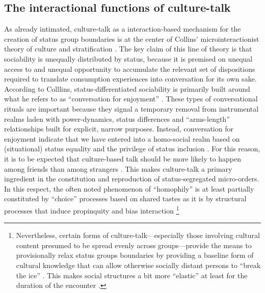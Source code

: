 \subsection{The interactional functions of culture-talk}
As already intimated, culture-talk as a interaction-based mechanism for the creation of status group boundaries is at the center of Collins' microinteractionist theory of culture and stratification \citep{collins75, collins81, collins00, collins04}. The key claim of this line of theory is that sociability is unequally distributed by status, because it is premised on unequal access to and unequal opportunity to accumulate the relevant set of dispositions required to translate consumption experiences into conversation for its own sake. According to Colllins, status-differentiated sociability is primarily built around what he refers to as ``conversation for enjoyment'' \citep[124]{collins75}.  These types of conversational rituals are important because they signal a temporary removal from instrumental realms laden with power-dynamics, status differences and ``arms-length'' relationships built for explicit, narrow purposes.  Instead, conversation for enjoyment indicate that we have entered into a homo-social realm based on (situational) status equality and the privilege of status inclusion \citep{milner04}.  For this reason, it is to be expected  that culture-based talk should be more likely to happen among friends than among strangers \citep[124]{collins75}. This makes culture-talk a primary ingredient in the constitution and reproduction of status-segregated micro-orders. In this respect, the often noted phenomenon of ``homophily'' is at least partially constituted by ``choice'' processes based on shared tastes as it is by structural processes that induce propinquity and bias interaction \citep{lazarsfeld_merton54}\footnote{Nevertheless, certain forms of culture-talk---especially those involving cultural content presumed to be spread evenly across groups---provide the means to provisionally relax status groups boundaries by providing a baseline form of cultural knowledge that can allow otherwise socially distant persons to ``break the ice'' \citep{erickson96}. This makes social structures a bit more ``elastic'' at least for the duration of the encounter \citep[85]{goffman66}.} 

